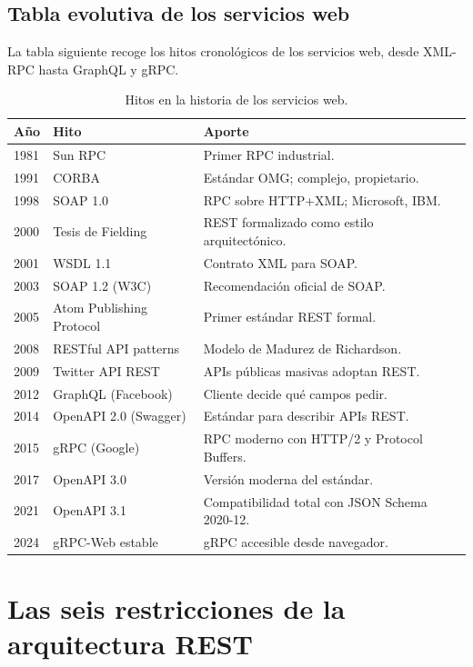 \subsection{Tabla evolutiva de los servicios web}

La tabla siguiente recoge los hitos cronológicos de los
servicios web, desde XML-RPC hasta GraphQL y gRPC.


\begin{table}[htbp]
\centering
\caption{Hitos en la historia de los servicios web.}
\footnotesize
\begin{tabularx}{\textwidth}{lll}
\toprule
\textbf{Año} & \textbf{Hito} & \textbf{Aporte}\\
\midrule
1981 & Sun RPC & Primer RPC industrial.\\
1991 & CORBA & Estándar OMG; complejo, propietario.\\
1998 & SOAP 1.0 & RPC sobre HTTP+XML; Microsoft, IBM.\\
2000 & Tesis de Fielding & REST formalizado como estilo arquitectónico.\\
2001 & WSDL 1.1 & Contrato XML para SOAP.\\
2003 & SOAP 1.2 (W3C) & Recomendación oficial de SOAP.\\
2005 & Atom Publishing Protocol & Primer estándar REST formal.\\
2008 & RESTful API patterns & Modelo de Madurez de Richardson.\\
2009 & Twitter API REST & APIs públicas masivas adoptan REST.\\
2012 & GraphQL (Facebook) & Cliente decide qué campos pedir.\\
2014 & OpenAPI 2.0 (Swagger) & Estándar para describir APIs REST.\\
2015 & gRPC (Google) & RPC moderno con HTTP/2 y Protocol Buffers.\\
2017 & OpenAPI 3.0 & Versión moderna del estándar.\\
2021 & OpenAPI 3.1 & Compatibilidad total con JSON Schema 2020-12.\\
2024 & gRPC-Web estable & gRPC accesible desde navegador.\\
\bottomrule
\end{tabularx}
\end{table}

\section{Las seis restricciones de la arquitectura REST}


